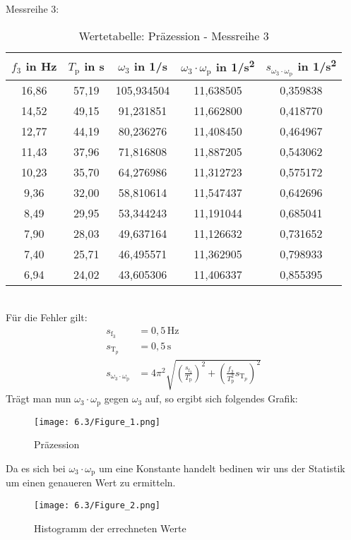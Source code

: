 Messreihe 3:
\begin{table}[h]
    \centering
    \begin{tabular}{c|c|c|c|c}
        \(f_3\) in Hz & \(T_\text{p}\) in s & \(\omega_3\) in 1/s  & \(\omega_3 \cdot \omega_\text{p}\) in 1/s\textsuperscript{2} & \(s_{\omega_3 \cdot \omega_\text{p}}\) in 1/s\textsuperscript{2} \\
        \hline
        16,86 &  57,19 &  105,934504 &  11,638505 &  0,359838 \\
        14,52 &  49,15 &   91,231851 &  11,662800 &  0,418770 \\
        12,77 &  44,19 &   80,236276 &  11,408450 &  0,464967 \\
        11,43 &  37,96 &   71,816808 &  11,887205 &  0,543062 \\
        10,23 &  35,70 &   64,276986 &  11,312723 &  0,575172 \\
        9,36 &  32,00 &   58,810614 &  11,547437 &  0,642696 \\
        8,49 &  29,95 &   53,344243 &  11,191044 &  0,685041 \\
        7,90 &  28,03 &   49,637164 &  11,126632 &  0,731652 \\
        7,40 &  25,71 &   46,495571 &  11,362905 &  0,798933 \\
        6,94 &  24,02 &   43,605306 &  11,406337 &  0,855395 \\
        \end{tabular}
        \caption{Wertetabelle: Präzession - Messreihe 3}
\end{table}\\
Für die Fehler gilt:
\begin{align}
    s_{\text{f}_3} &= 0,5 \, \text{Hz} \\
    s_{\text{T}_p} &= 0,5 \, \text{s}  \\
    s_{\omega_3 \cdot \omega_\text{p}} &= 4\pi^2 \sqrt{(\frac{s_{\text{f}_3}}{T_\text{p}})^2 + (\frac{f_3}{T_\text{p}^2} s_{\text{T}_p})^2}
\end{align}
\newpage
Trägt man nun \(\omega_3 \cdot \omega_\text{p}\) gegen \(\omega_3\) auf, so ergibt sich folgendes Grafik:
\begin{figure}[h]
    \centering
    \texttt{[image: 6.3/Figure\_1.png]}
    \caption{Präzession}%
\end{figure}

Da es sich bei \(\omega_3 \cdot \omega_\text{p}\) um eine Konstante handelt bedinen wir uns der Statistik um einen genaueren Wert zu ermitteln.
\begin{figure}[h]
    \centering
    \texttt{[image: 6.3/Figure\_2.png]}
    \caption{Histogramm der errechneten Werte}%
\end{figure}\\

